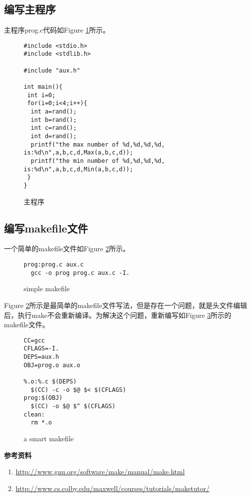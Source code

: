 \subsection{编写主程序}
主程序prog.c代码如Figure \ref{Mf3}所示。
\begin{figure}
\begin{verbatim}
#include <stdio.h>
#include <stdlib.h>

#include "aux.h"

int main(){
 int i=0;
 for(i=0;i<4;i++){
  int a=rand();
  int b=rand();
  int c=rand();
  int d=rand(); 
  printf("the max number of %d,%d,%d,%d, is:%d\n",a,b,c,d,Max(a,b,c,d));    
  printf("the min number of %d,%d,%d,%d, is:%d\n",a,b,c,d,Min(a,b,c,d));
 }
}
\end{verbatim}
\caption{主程序}
\label{Mf3}
\end{figure}


\subsection{编写makefile文件}
一个简单的makefile文件如Figure \ref{Mf4}所示。
\begin{figure}
\begin{verbatim}
prog:prog.c aux.c
  gcc -o prog prog.c aux.c -I.
\end{verbatim}
\caption{simple makefile}
\label{Mf4}
\end{figure}
Figure \ref{Mf4}所示是最简单的makefile文件写法，但是存在一个问题，就是头文件编辑后，执行make不会重新编译。为解决这个问题，重新编写如Figure \ref{Mf5}所示的makefile文件。
\begin{figure}
\begin{verbatim}
CC=gcc
CFLAGS=-I.
DEPS=aux.h
OBJ=prog.o aux.o

%.o:%.c $(DEPS)
  $(CC) -c -o $@ $< $(CFLAGS)
prog:$(OBJ)
  $(CC) -o $@ $^ $(CFLAGS)
clean:
  rm *.o
\end{verbatim}
\caption{a smart makefile}
\label{Mf5}
\end{figure}

\textbf{参考资料}
\begin{enumerate}
\item
\url{http://www.gnu.org/software/make/manual/make.html}
\item
\url{http://www.cs.colby.edu/maxwell/courses/tutorials/maketutor/}
\end{enumerate}
